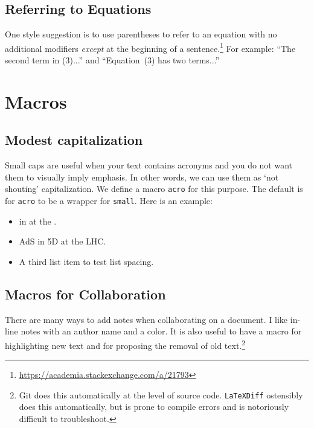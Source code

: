 \subsection{Referring to Equations}

One style suggestion is to use parentheses to refer to an equation with no additional modifiers \emph{except} at the beginning of a sentence.\footnote{\url{https://academia.stackexchange.com/a/21793}} For example: ``The second term in (3)...'' and ``Equation~(3) has two terms...''



\section{Macros}
\label{sec:macros}


\subsection{Modest capitalization}

Small caps are useful when your text contains acronyms and you do not want them to visually imply emphasis. In other words, we can use them as `not shouting' capitalization. We define a macro \texttt{acro} for this purpose. The default is for \texttt{acro} to be a wrapper for \texttt{small}. Here is an example:
\begin{itemize}
	\item {} in  at the .
	\item AdS in 5D at the LHC. 
	\item A third list item to test list spacing.
\end{itemize}


\subsection{Macros for Collaboration}

There are many ways to add notes when collaborating on a document. I like in-line notes with an author name and a color.   It is also useful to have a macro for highlighting new text and for proposing the removal of old text.\footnote{Git does this automatically at the level of source code. \texttt{LaTeXDiff} ostensibly does this automatically, but is prone to compile errors and is notoriously difficult to troubleshoot.}


